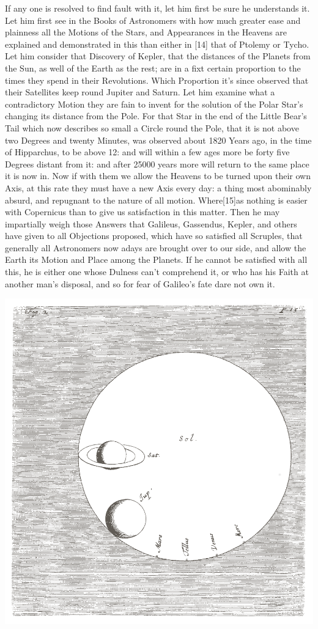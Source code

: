 \documentclass[letterpaper]{book}
\begin{document}
If any one is resolved to find fault with it, let him first be sure he
understands it. Let him first see in the Books of Astronomers with how much
greater ease and plainness all the Motions of the Stars, and Appearances in
the Heavens are explained and demonstrated in this than either in [14] that
of Ptolemy or Tycho. Let him consider that Discovery of Kepler, that the
distances of the Planets from the Sun, as well of the Earth as the rest; are
in a fixt certain proportion to the times they spend in their Revolutions.
Which Proportion it's since observed that their Satellites keep round
Jupiter and Saturn. Let him examine what a contradictory Motion they are
fain to invent for the solution of the Polar Star's changing its distance
from the Pole. For that Star in the end of the Little Bear's Tail which now
describes so small a Circle round the Pole, that it is not above two Degrees
and twenty Minutes, was observed about 1820 Years ago, in the time of
Hipparchus, to be above 12: and will within a few ages more be forty five
Degrees distant from it: and after 25000 years more will return to the same
place it is now in. Now if with them we allow the Heavens to be turned upon
their own Axis, at this rate they must have a new Axis every day: a thing
most abominably absurd, and repugnant to the nature of all motion.
Where[15]as nothing is easier with Copernicus than to give us satisfaction
in this matter. Then he may impartially weigh those Answers that Galileus,
Gassendus, Kepler, and others have given to all Objections proposed, which
have so satisfied all Scruples, that generally all Astronomers now adays are
brought over to our side, and allow the Earth its Motion and Place among the
Planets. If he cannot be satisfied with all this, he is either one whose
Dulness can't comprehend it, or who has his Faith at another man's disposal,
and so for fear of Galileo's fate dare not own it.

\begin{center}
	\includegraphics[width=.90 \textwidth]{ct_2_en.jpg}
\end{center}
\end{document}
